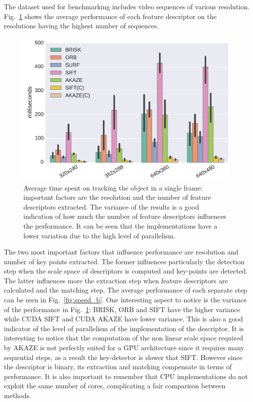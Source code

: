 The dataset used for benchmarking includes video sequences of various resolution. Fig.~\ref{fig:speed} shows the average performance of each feature descriptor on the resolutions having the highest number of sequences. 

\begin{figure}[!htb]
	\includegraphics[width=0.95\linewidth]{imgs/tracker_fps_std.pdf}
\vspace{-2.5mm}	
\caption{Average time spent on tracking the object in a single frame: important factors are the resolution and the number of feature descriptors extracted. The variance of the results is a good indication of how much the number of feature descriptors influences the performance. It can be seen that the implementations have a lower variation due to the high level of parallelism. }
\vspace{-2mm}
\label{fig:speed}
\end{figure}

The two most important factors that influence performance are resolution and number of key points extracted. The former influences particularly the detection step when the scale space of descriptors is computed and key-points are detected. The latter influences more the extraction step when feature descriptors are calculated and the matching step. The average performance of each separate step can be seen in Fig.~\ref{fig:speed_b}. One interesting aspect to notice is the variance of the performance in Fig.~\ref{fig:speed}: BRISK, ORB and SIFT have the higher variance while CUDA SIFT and CUDA AKAZE have lower variance. This is also a good indicator of the level of parallelism of the implementation of the descriptor. It is interesting to notice that the computation of the non linear scale space required by AKAZE is not perfectly suited for a GPU architecture since it requires many sequential steps, as a result the key-detector is slower that SIFT. However since the descriptor is binary, its extraction and matching compensate in terms of performance. It is also important to remember that CPU implementations do not exploit the same number of cores, complicating a fair comparison between methods.

